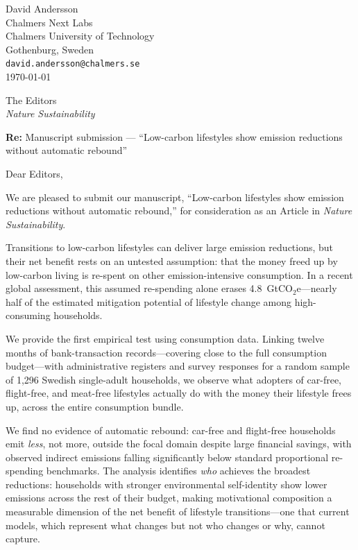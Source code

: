 \documentclass[12pt,a4paper]{article}
\begin{document}
\begin{flushright}
David Andersson\\
Chalmers Next Labs\\
Chalmers University of Technology\\
Gothenburg, Sweden\\[0.4em]
\texttt{david.andersson@chalmers.se}\\[1em]
\today
\end{flushright}

The Editors\\[0.2em]
\textit{Nature Sustainability}

\bigskip

\textbf{Re:} Manuscript submission --- ``Low-carbon lifestyles show
emission reductions without automatic rebound''

\bigskip

Dear Editors,

We are pleased to submit our manuscript, ``Low-carbon lifestyles show
emission reductions without automatic rebound,'' for consideration as an Article
in \textit{Nature Sustainability}.

Transitions to low-carbon lifestyles can deliver large emission reductions, but their net benefit rests on an untested assumption: that the money freed up by low-carbon living is re-spent on other emission-intensive consumption. In a recent global assessment, this assumed re-spending alone erases 4.8~GtCO$_2$e---nearly half of the estimated mitigation potential of lifestyle change among high-consuming households.

We provide the first empirical test using consumption data. Linking twelve months of bank-transaction records---covering close to the full consumption budget---with administrative registers and survey responses for a random sample of 1,296 Swedish single-adult households, we observe what adopters of car-free, flight-free, and meat-free lifestyles actually do with the money their lifestyle frees up, across the entire consumption bundle.

We find no evidence of automatic rebound: car-free and flight-free households emit \textit{less}, not more, outside the focal domain despite large financial savings, with observed indirect emissions falling significantly below standard proportional re-spending benchmarks. The analysis identifies \textit{who} achieves the broadest reductions: households with stronger environmental self-identity show lower emissions across the rest of their budget, making motivational composition a measurable dimension of the net benefit of lifestyle transitions---one that current models, which represent what changes but not who changes or why, cannot capture.
\end{document}
